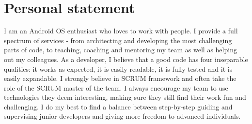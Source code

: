 \documentclass[letterpaper]{twentysecondcv} %
\begin{document}

\section{Personal statement}

I am an Android OS enthusiast who loves to work with people. I provide a full spectrum of services - from architecting and developing the most challenging parts of code, to teaching, coaching and mentoring my team as well as helping out my colleagues. As a developer, I believe that a good code has four inseparable qualities: it works as expected, it is easily readable, it is fully tested and it is easily expandable. I strongly believe in SCRUM framework and often take the role of the SCRUM master of the team. I always encourage my team to use technologies they deem interesting, making sure they still find their work fun and challenging. I do my best to find a balance between step-by-step guiding and supervising junior developers and giving more freedom to advanced individuals.
\end{document}
